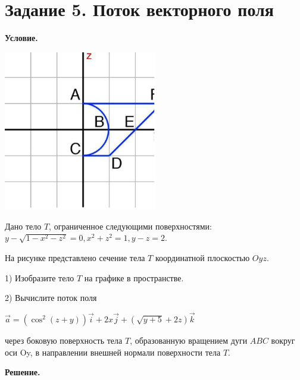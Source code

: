 \section{Задание 5. Поток векторного поля}

\textbf{Условие.}

\begin{multicols}{2}
    \includegraphics[height=7cm]{images/5a1}

    Дано тело $T$, ограниченное следующими поверхностями: $\displaystyle y - \sqrt{1 - x^2 - z^2} = 0, x^2 + z^2 = 1, y - z = 2$.

    На рисунке представлено сечение тела $T$ координатной плоскостью $Oyz$.

    1) Изобразите тело $T$ на графике в пространстве.

    2) Вычислите поток поля

    $\displaystyle \overrightarrow{a} = (\cos^2(z + y))\overrightarrow{i} + 2x\overrightarrow{j} + \left(\sqrt{y + 5} + 2z\right) \overrightarrow{k}$

    через боковую поверхность тела $T$, образованную вращением дуги $ABC$ вокруг оси Oy, в направлении внешней нормали поверхности тела $T$.
\end{multicols}


\vspace{10mm}
\textbf{Решение.}


